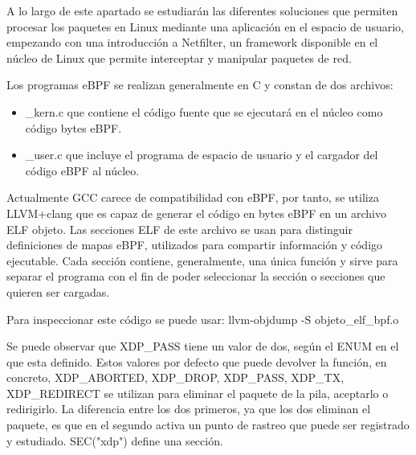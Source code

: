 A lo largo de este apartado se estudiarán las diferentes soluciones que permiten procesar los paquetes en Linux mediante una aplicación en el espacio de usuario, empezando con una introducción a Netfilter, un framework disponible en el núcleo de Linux que permite interceptar y manipular paquetes de red.

Los programas eBPF se realizan generalmente en C y constan de dos archivos:
\begin{itemize}
        \item \_kern.c que contiene el código fuente que se ejecutará en el núcleo como código bytes eBPF.
        \item \_user.c que incluye el programa de espacio de usuario y el cargador del código eBPF al núcleo.
\end{itemize}
Actualmente GCC carece de compatibilidad con eBPF, por tanto, se utiliza LLVM+clang que es capaz de generar el código en bytes eBPF en un archivo ELF objeto.
Las secciones ELF de este archivo se usan para distinguir definiciones de mapas eBPF, utilizados para compartir información y código ejecutable. Cada sección contiene, generalmente, una única función y sirve para separar el programa con el fin de poder seleccionar la sección o secciones que quieren ser cargadas.

Para inspeccionar este código se puede usar: llvm-objdump -S objeto\_elf\_bpf.o


Se puede observar que XDP\_PASS tiene un valor de dos, según el ENUM en el que esta definido. Estos valores por defecto que puede devolver la función, en concreto, XDP\_ABORTED, XDP\_DROP, XDP\_PASS, XDP\_TX, XDP\_REDIRECT se utilizan para eliminar el paquete de la pila, aceptarlo o redirigirlo. La diferencia entre los dos primeros, ya que los dos eliminan el paquete, es que en el segundo activa un punto de rastreo que puede ser registrado y estudiado. SEC("xdp") define una sección.

